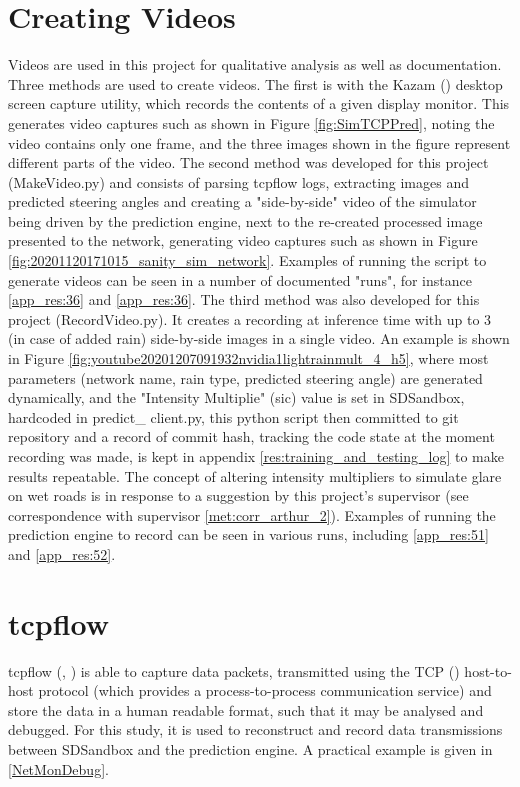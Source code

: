 \section{Creating Videos}
Videos are used in this project for qualitative analysis as well as documentation. Three methods are used to create videos. The first is with the Kazam (\cite{Kazam2020}) desktop screen capture utility, which records the contents of a given display monitor. This generates video captures such as shown in Figure \ref{fig:SimTCPPred}, noting the video contains only one frame, and the three images shown in the figure represent different parts of the video. The second method was developed for this project (MakeVideo.py) and consists of parsing tcpflow logs, extracting images and predicted steering angles and creating a "side-by-side" video of the simulator being driven by the prediction engine, next to the re-created processed image presented to the network, generating video captures such as shown in Figure  \ref{fig:20201120171015_sanity_sim_network}. Examples of running the script to generate videos can be seen in a number of documented "runs", for instance \ref{app_res:36} and \ref{app_res:36}. The third method was also developed for this project (RecordVideo.py). It creates a recording at inference time with up to 3 (in case of added rain) side-by-side images in a single video. An example is shown in Figure \ref{fig:youtube20201207091932nvidia1lightrainmult_4_h5}, where most parameters (network name, rain type, predicted steering angle) are generated dynamically, and the "Intensity Multiplie" (sic) value is set in SDSandbox, hardcoded in predict\_ client.py, this python script then committed to git repository and a record of commit hash, tracking the code state at the moment recording was made, is kept in appendix \ref{res:training_and_testing_log} to make results repeatable. The concept of altering intensity multipliers to simulate glare on wet roads is in response to a suggestion by this project's supervisor (see correspondence with supervisor \ref{met:corr_arthur_2}). Examples of running the prediction engine to record can be seen in various runs, including \ref{app_res:51} and \ref{app_res:52}.

\section{tcpflow}
tcpflow (\cite{tcpflowElson2013}, \cite{garfinkel2013passive}) is able to capture data packets, transmitted using the TCP (\cite{rfc793}) host-to-host protocol (which provides a process-to-process communication service) and store the data in a human readable format, such that it may be analysed and debugged. For this study, it is used to reconstruct and record data transmissions between SDSandbox and the prediction engine. A practical example is given in \ref{NetMonDebug}.

